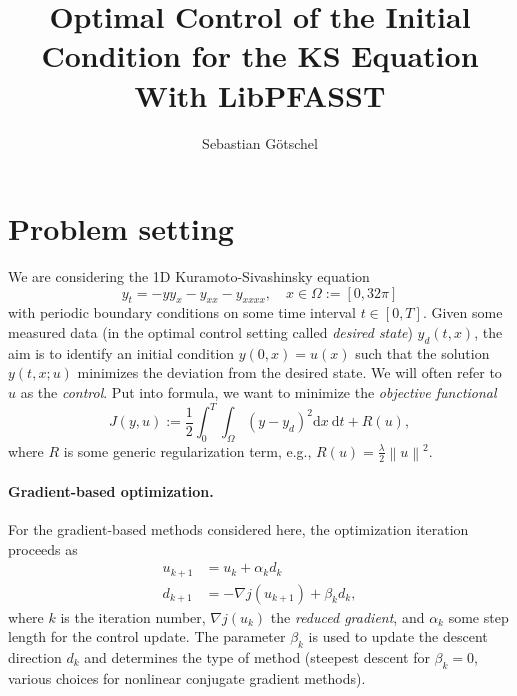 \documentclass[a4paper]{article} %
\newcommand{\norm}[1]{\left\|#1\right\|}
\begin{document}
\title{Optimal Control of the Initial Condition for the KS Equation With LibPFASST}
\author{Sebastian Götschel}
\maketitle

\section{Problem setting}


We are considering the 1D Kuramoto-Sivashinsky equation
\begin{equation} \label{eq:KS}
y_t = -y y_x - y_{xx} - y_{xxxx}, \quad x \in \Omega := [0,32\pi]
\end{equation}
with periodic boundary conditions on some time interval $t \in [0,T]$. Given some measured data (in the optimal control setting called \emph{desired state}) $y_d(t,x)$, the aim is to identify an initial condition $y(0,x) = u(x)$ such that the solution $y(t,x;u)$ minimizes the deviation from the desired state. We will often refer to $u$ as the \emph{control}. Put into formula, we want to minimize the \emph{objective functional}
\begin{equation}\label{eq:obj}
J(y,u) := \frac{1}{2}\int_{0}^{T} \int_\Omega (y-y_d)^2 \mathrm{d}x\ \mathrm{d}t + R(u),
\end{equation}
where $R$ is some generic regularization term, e.g., $R(u) = \frac{\lambda}{2} \norm{u}^2$.


\paragraph{Gradient-based optimization.} For the gradient-based methods considered here, the optimization iteration proceeds as 
\begin{align}
u_{k+1} &= u_k + \alpha_k d_k \label{eq:update_u} \\
d_{k+1} &= -\nabla j(u_{k+1})+ \beta_k d_k, \label{eq:update_d}
\end{align}
where $k$ is the iteration number, $\nabla j(u_{k})$ the \emph{reduced gradient}, and $\alpha_k$ some step length for the control update. The parameter $\beta_k$ is used to update the descent direction $d_k$ and determines the type of method (steepest descent for $\beta_k = 0$, various choices for nonlinear conjugate gradient methods).
\end{document}
